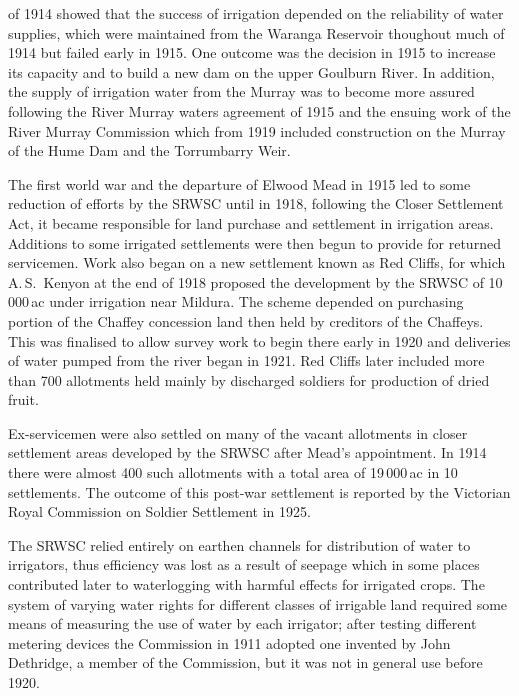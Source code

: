 of 1914 showed that the success of irrigation depended on the
reliability of water supplies, which were maintained from the Waranga
Reservoir thoughout much of 1914 but failed early in 1915.  One
outcome was the decision in 1915 to increase its capacity and to build
a new dam on the upper Goulburn River.  In addition, the supply of irrigation
water from the Murray was to become more assured following the River
Murray waters agreement of 1915 and the ensuing work of the River
Murray Commission which from 1919 included construction on the Murray
of the Hume Dam and the Torrumbarry Weir.

The first world war and the departure of Elwood Mead in 1915 led to
some reduction of efforts by the SRWSC until in 1918, following the
Closer Settlement Act, it became responsible for land purchase and
settlement in irrigation areas.  Additions to
some irrigated settlements were then begun to provide for returned
servicemen.  Work also began on a new settlement known as Red Cliffs,
for which A.\,S.~Kenyon at the end of 1918 proposed the development by
the SRWSC of 10\,000\,ac under irrigation near
Mildura.
The scheme depended on purchasing portion of the Chaffey concession
land then held by creditors of the Chaffeys.  This was finalised to
allow survey work to begin there early in 1920 and deliveries of water
pumped from the river began in 1921.  Red Cliffs later included more
than 700 allotments held mainly by discharged soldiers for production
of dried fruit.

Ex-servicemen were also settled on many of the vacant allotments in
closer settlement areas developed by the SRWSC after Mead's
appointment.  In 1914 there were almost 400 such allotments with a
total area of 19\,000\,ac in 10 settlements.  The
outcome of this post-war settlement is reported by the Victorian Royal
Commission on Soldier Settlement in 1925.

The SRWSC relied entirely on earthen channels for distribution of
water to irrigators, thus efficiency was lost as a result of seepage
which in some places contributed later to waterlogging with harmful
effects for irrigated crops.  The system of varying water rights for
different classes of irrigable land required some means of measuring
the use of water by each irrigator; after testing different metering
devices the Commission in 1911 adopted one invented by John Dethridge,
a member of the Commission, but it was not in general use before
1920.

